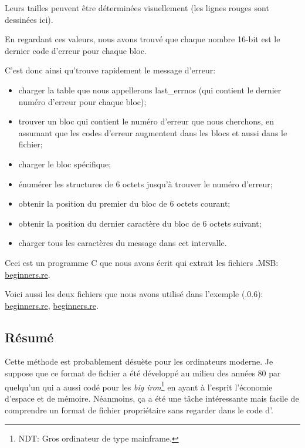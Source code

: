 Leurs tailles peuvent être déterminées visuellement (les lignes rouges sont
dessinées ici).

En regardant ces valeurs, nous avons trouvé que chaque nombre 16-bit est le dernier
code d'erreur pour chaque bloc.

C'est donc ainsi qu'\oracle trouve rapidement le message d'erreur:

\begin{itemize}
\item charger la table que nous appellerons last\_errnos (qui contient le dernier
numéro d'erreur pour chaque bloc);

\item trouver un bloc qui contient le numéro d'erreur que nous cherchons, en assumant
que les codes d'erreur augmentent dans les blocs et aussi dans le fichier;

\item charger le bloc spécifique;

\item énumérer les structures de 6 octets jusqu'à trouver le numéro d'erreur;

\item obtenir la position du premier du bloc de 6 octets courant;

\item obtenir la position du dernier caractère du bloc de 6 octets suivant;

\item charger tous les caractères du message dans cet intervalle.
\end{itemize}

Ceci est un programme C que nous avons écrit qui extrait les fichiers .MSB:
\href{http://beginners.re/examples/oracle/MSB/oracle_msb.c}{beginners.re}.

Voici aussi les deux fichiers que nous avons utilisé dans l'exemple
(.0.6):
\href{http://beginners.re/examples/oracle/MSB/oraus.msb}{beginners.re},
\href{http://beginners.re/examples/oracle/MSB/oraus.msg}{beginners.re}.

\subsection{Résumé}

Cette méthode est probablement désuète pour les ordinateurs moderne.
Je suppose que ce format de fichier a été développé au milieu des années 80 par
quelqu'un qui a aussi codé pour les \emph{big iron}\footnote{NDT: Gros ordinateur
de type mainframe.} en ayant à l'esprit l'économie d'espace et de mémoire.
Néanmoins, ça a été une tâche intéressante mais facile de comprendre
un format de fichier propriétaire sans regarder dans le code d'\oracle.
